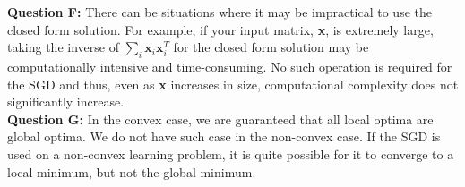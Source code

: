 \documentclass[12 pt]{article}
\begin{document}
	\noindent\textbf{Question F:} There can be situations where it may be impractical to use the closed form solution. For example, if your input matrix, \textbf{x}, is extremely large, taking the inverse of $\sum\limits_i\textbf{x}_i\textbf{x}_i^T$ for the closed form solution may be computationally intensive and time-consuming. No such operation is required for the SGD and thus, even as \textbf{x} increases in size, computational complexity does not significantly increase. \\
	
	\noindent\textbf{Question G:} In the convex case, we are guaranteed that all local optima are global optima. We do not have such case in the non-convex case. If the SGD is used on a non-convex learning problem, it is quite possible for it to converge to a local minimum, but not the global minimum. \\
	
\end{document}
